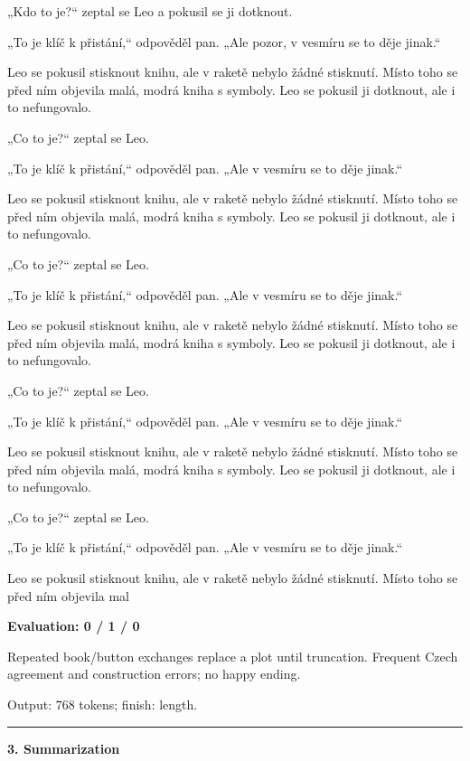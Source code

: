 \documentclass[10pt]{article}
\begin{document}
{\begin{minipage}{\textwidth}
„Kdo to je?“ zeptal se Leo a pokusil se ji dotknout.
\par\smallskip
„To je klíč k přistání,“ odpověděl pan. „Ale pozor, v vesmíru se to děje jinak.“
\par\smallskip
Leo se pokusil stisknout knihu, ale v raketě nebylo žádné stisknutí. Místo toho se před ním objevila malá, modrá kniha s symboly. Leo se pokusil ji dotknout, ale i to nefungovalo.
\par\smallskip
„Co to je?“ zeptal se Leo.
\par\smallskip
„To je klíč k přistání,“ odpověděl pan. „Ale v vesmíru se to děje jinak.“
\par\smallskip
Leo se pokusil stisknout knihu, ale v raketě nebylo žádné stisknutí. Místo toho se před ním objevila malá, modrá kniha s symboly. Leo se pokusil ji dotknout, ale i to nefungovalo.
\par\smallskip
„Co to je?“ zeptal se Leo.
\par\smallskip
„To je klíč k přistání,“ odpověděl pan. „Ale v vesmíru se to děje jinak.“
\par\smallskip
Leo se pokusil stisknout knihu, ale v raketě nebylo žádné stisknutí. Místo toho se před ním objevila malá, modrá kniha s symboly. Leo se pokusil ji dotknout, ale i to nefungovalo.
\par\smallskip
„Co to je?“ zeptal se Leo.
\par\smallskip
„To je klíč k přistání,“ odpověděl pan. „Ale v vesmíru se to děje jinak.“
\par\smallskip
Leo se pokusil stisknout knihu, ale v raketě nebylo žádné stisknutí. Místo toho se před ním objevila malá, modrá kniha s symboly. Leo se pokusil ji dotknout, ale i to nefungovalo.
\par\smallskip
„Co to je?“ zeptal se Leo.
\par\smallskip
„To je klíč k přistání,“ odpověděl pan. „Ale v vesmíru se to děje jinak.“
\par\smallskip
Leo se pokusil stisknout knihu, ale v raketě nebylo žádné stisknutí. Místo toho se před ním objevila mal\par\smallskip
\textbf{Evaluation: 0 / 1 / 0}\par Repeated book/button exchanges replace a plot until truncation. Frequent Czech agreement and construction errors; no happy ending.
\par {\color{gray} Output: 768 tokens; finish: length.}\par
\medskip\hrule\smallskip
{\bfseries 3. Summarization}\par\smallskip

\end{minipage}}
\end{document}
